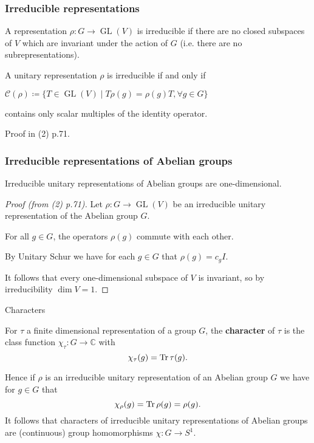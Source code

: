 \documentclass[mathserif
, handout
]{beamer}
\DeclareMathOperator{\GL}{GL}
\begin{document}
\begin{frame}
    \frametitle{Irreducible representations}
    A representation $\rho\colon G\to \GL(V)$ is irreducible if there are no closed subspaces of $V$ which are invariant under the action of $G$ (i.e. there are no subrepresentations).
    \pause

    \begin{Theorem}
        A unitary representation $\rho$ is irreducible if and only if \begin{center}
            $\mathcal{C}(\rho)\coloneqq \{T\in \GL(V)\mid T\rho(g) = \rho(g) T,\forall g\in G\}$
        \end{center} %
        contains only scalar multiples of the identity operator.
    \end{Theorem} Proof in (2) p.71.
\end{frame}

\begin{frame}
    \frametitle{Irreducible representations of Abelian groups}
    \begin{Corollary}
        Irreducible unitary representations of Abelian groups are one-dimensional.
    \end{Corollary}
    \pause

    \begin{proof}[Proof (from (2) p.71)]
        Let $\rho\colon G\to \GL(V)$ be an irreducible unitary representation of the Abelian group $G$. \pause 
        
        For all $g\in G$, the operators $\rho(g)$ commute with each other. \pause 
        
        By Unitary Schur we have for each $g\in G$ that $\rho(g) = c_gI$. \pause

        It follows that every one-dimensional subspace of $V$ is invariant, so by irreducibility $\dim V = 1$.
    \end{proof} %
\end{frame}

\begin{frame}{Characters}
    \begin{definition}
        For $\tau$ a finite dimensional representation of a group $G$, the \textbf{character} of $\tau$ is the class function $\chi_\tau\colon G\to \mathbb{C}$ with \[\chi_\tau(g) = \Tr \tau(g).\]
    \end{definition}
    \pause

    Hence if $\rho$ is an irreducible unitary representation of an Abelian group $G$ we have for $g\in G$ that \[\chi_\rho(g) = \Tr \rho(g) = \rho(g).\]
    \pause
    It follows that characters of irreducible unitary representations of Abelian groups are (continuous) group homomorphisms $\chi\colon G\to S^1$.
\end{frame}
\end{document}
